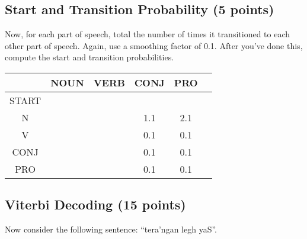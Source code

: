 \documentclass[11pt]{article}
\begin{document}
\subsection{Start and Transition Probability (5 points)}

Now, for each part of speech, total the number of times it
transitioned to each other part of speech.  Again, use a smoothing
factor of 0.1.  After you've done this, compute the start and transition probabilities.

\begin{center}
\begin{tabular}{|c|c|c|c|c|c|}
\hline
      & NOUN & VERB & CONJ & PRO \\
\hline
START &  &   &  &   \\
\hline
N     &   &   & 1.1  & 2.1  \\
\hline
V     &   &   & 0.1  & 0.1  \\
\hline
CONJ  &   &   &  0.1 & 0.1 \\
\hline
PRO   &  &   &  0.1 & 0.1 \\
\hline
\end{tabular}
\end{center}

\subsection{Viterbi Decoding (15 points)}

Now consider the following sentence: ``tera'ngan legh yaS''.
\end{document}
